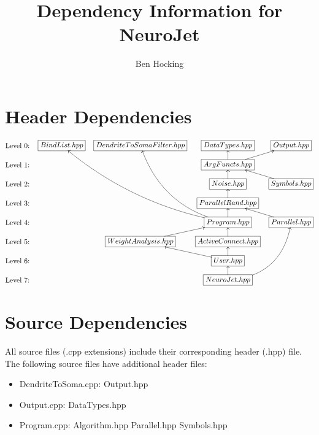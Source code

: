 \documentclass[landscape]{article}
\author{Ben Hocking}
\title{Dependency Information for NeuroJet}
\begin{document}
\maketitle

\section{Header Dependencies}
\begin{displaymath}
\entrymodifiers={}
\SelectTips{cm}{}
\xymatrix @-1pc {
 *\txt{Level 0:} & *+[F-]{BindList.hpp} & *+[F-]{DendriteToSomaFilter.hpp}   & *+[F-]{DataTypes.hpp}                                                   & *+[F-]{Output.hpp}                 \\
 *\txt{Level 1:} &                      &                                    & *+[F-]{ArgFuncts.hpp}     \ar[u] \ar[ur]                                &                                    \\
 *\txt{Level 2:} &                      &                                    & *+[F-]{Noise.hpp}         \ar[u]                                        & *+[F-]{Symbols.hpp}  \ar[ul]       \\
 *\txt{Level 3:} &                      &                                    & *+[F-]{ParallelRand.hpp}  \ar[u]                                        &                                    \\
 *\txt{Level 4:} &                      &                                    & *+[F-]{Program.hpp}       \ar[u] \ar@/^1.5pc/[uuuull] \ar@/^2pc/[uuuul] & *+[F-]{Parallel.hpp} \ar[ul]       \\
 *\txt{Level 5:} &                      & *+[F-]{WeightAnalysis.hpp} \ar[ur] & *+[F-]{ActiveConnect.hpp} \ar[u]                                        &                                    \\
 *\txt{Level 6:} &                      &                                    & *+[F-]{User.hpp}          \ar[u] \ar[ul]                                &                                    \\
 *\txt{Level 7:} &                      &                                    & *+[F-]{NeuroJet.hpp}      \ar[u] \ar@/_2pc/[uuur]                       &                                    \\
}
\end{displaymath}

\section{Source Dependencies}

All source files (.cpp extensions) include their corresponding header (.hpp) file.
The following source files have additional header files:

\begin{itemize}
\item DendriteToSoma.cpp: Output.hpp
\item Output.cpp: DataTypes.hpp
\item Program.cpp: Algorithm.hpp Parallel.hpp Symbols.hpp
\end{itemize}
\end{document}
